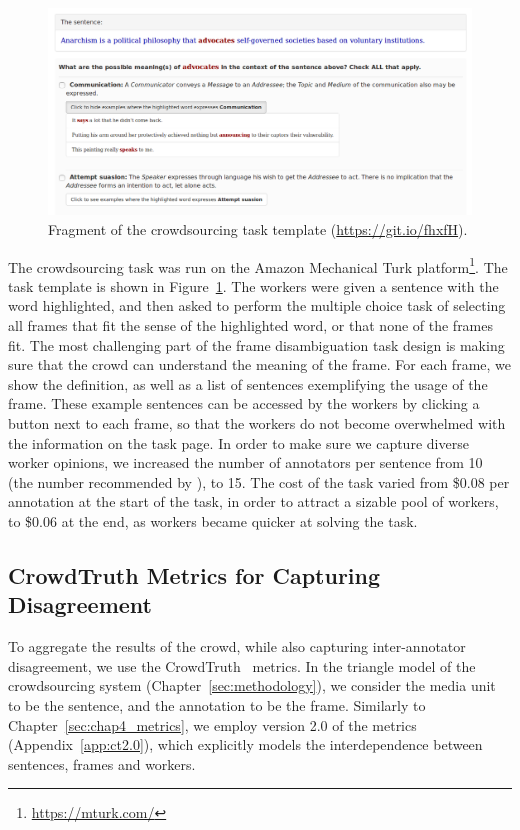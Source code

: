 \begin{figure}[thb!]
\centering
\includegraphics[width=\textwidth]{img/sent-frame.png}
\caption{Fragment of the crowdsourcing task template (\url{https://git.io/fhxfH}).}
\label{fig:ch5template}
\end{figure}


The crowdsourcing task was run on the Amazon Mechanical Turk platform\footnote{\url{https://mturk.com/}}. The task template is shown in Figure~\ref{fig:ch5template}. The workers were given a sentence with the word highlighted, and then asked to perform the multiple choice task of selecting all frames that fit the sense of the highlighted word, or that none of the frames fit. The most challenging part of the frame disambiguation task design is making sure that the crowd can understand the meaning of the frame. For each frame, we show the definition, as well as a list of sentences exemplifying the usage of the frame. These example sentences can be accessed by the workers by clicking a button next to each frame, so that the workers do not become overwhelmed with the information on the task page. In order to make sure we capture diverse worker opinions, we increased the number of annotators per sentence from 10 (the number recommended by \citet{Hong:2011:GCR:2018966.2018970}), to 15. The cost of the task varied from \$0.08 per annotation at the start of the task, in order to attract a sizable pool of workers, to \$0.06 at the end, as workers became quicker at solving the task.


\subsection{CrowdTruth Metrics for Capturing Disagreement}
\label{sec:frame-metrics}

To aggregate the results of the crowd, while also capturing inter-annotator disagreement, we use the CrowdTruth~\cite{aroyo2014threesides} metrics. In the triangle model of the crowdsourcing system (Chapter~\ref{sec:methodology}), we consider the media unit to be the sentence, and the annotation to be the frame.
Similarly to Chapter~\ref{sec:chap4_metrics}, we employ version 2.0 of the metrics (Appendix~\ref{app:ct2.0}), which explicitly models the interdependence between sentences, frames and workers.

